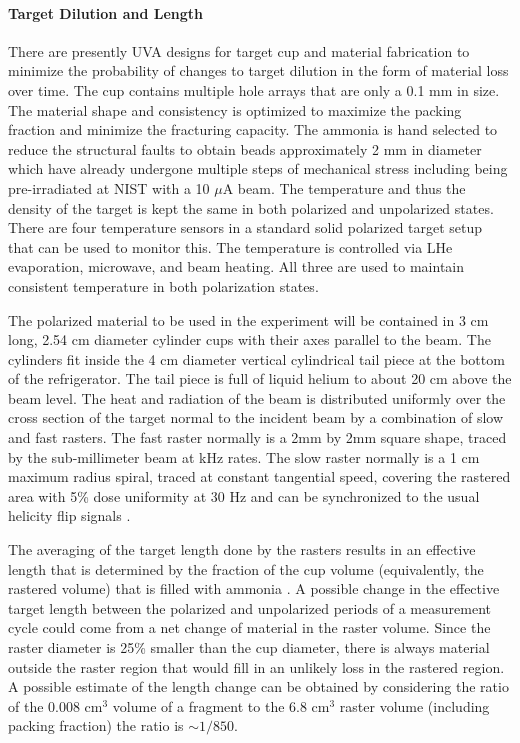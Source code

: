 \paragraph{Target Dilution and Length}

There are presently UVA designs for target cup and material fabrication to minimize the probability
of changes to target dilution in the form of material loss over time.  The cup contains
multiple hole arrays that are only a 0.1 mm in size.  The material shape and consistency 
is optimized to maximize the packing fraction and minimize the fracturing capacity.  The
ammonia is hand selected to reduce the structural faults to obtain beads approximately 
2 mm in diameter which have already undergone multiple steps of mechanical stress including being pre-irradiated at NIST with a 10 $\mu$A beam.  The temperature
and thus the density of the target is kept the same
in both polarized and unpolarized states.  There are four temperature sensors in a
standard solid polarized target setup that can be used to monitor this.  The temperature
is controlled via LHe evaporation, microwave, and beam heating.  All three are used
to maintain consistent temperature in both polarization states.

The polarized material to be used in the experiment will be contained in 3 cm 
long, 2.54 cm diameter cylinder cups with their axes parallel to the beam.
The cylinders fit inside the 4 cm diameter vertical cylindrical tail piece at 
the bottom of the refrigerator.  The tail piece is full of liquid helium to 
about 20 cm above the beam level.  The heat and radiation of the beam is distributed
uniformly over the cross section of the target normal to the incident beam by a combination
of slow and fast rasters. The fast raster normally is a 2mm by 2mm square shape, traced by the 
sub-millimeter beam at kHz rates.  The slow raster normally is a 1 cm maximum radius spiral, traced at constant tangential speed, covering the rastered area with 5\% dose uniformity at 30 Hz
and can be synchronized to the usual helicity flip signals \cite{chenyan}.

The averaging of the target length done by the rasters results in an effective 
length that is determined by the fraction of the cup volume 
(equivalently, the rastered volume) that is filled with ammonia \cite{chenyan}.
A possible change in the effective target length between the polarized and 
unpolarized periods of a measurement cycle could come from a net change of 
material in the raster volume. Since the raster diameter is 25\% smaller than 
the cup diameter, there is always material outside the raster region that would
fill in an unlikely loss in the rastered region.
A possible estimate of the length change can be obtained by considering the 
ratio of the 0.008 cm$^3$ volume of a fragment to the 6.8 cm$^3$ raster volume 
(including packing fraction) the ratio is $\sim 1/850$.

